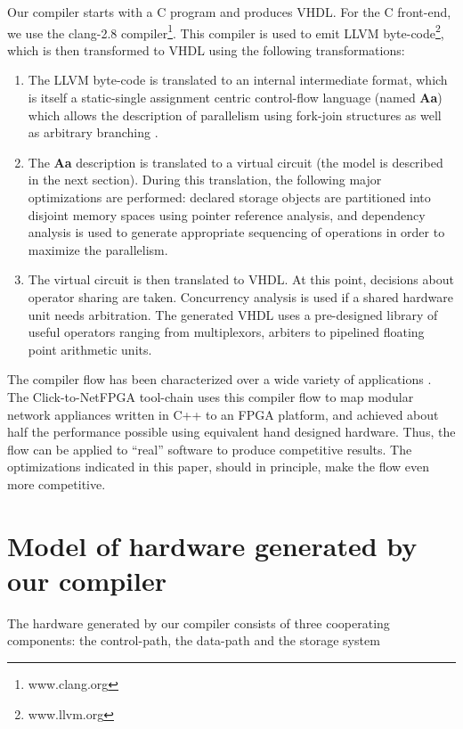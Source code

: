 \documentclass[conference]{IEEEtran}
\begin{document}
Our compiler starts with a C program and produces VHDL.  For the
C front-end, we use the clang-2.8 compiler\footnote{www.clang.org}.
This compiler is used to emit LLVM byte-code\footnote{www.llvm.org}, 
which is then transformed to VHDL using the following transformations:
\begin{enumerate}
\item The LLVM byte-code is translated to an internal intermediate
format, which is itself a static-single assignment centric 
control-flow language (named {\bf Aa}) which allows the description of parallelism
using fork-join structures as well as arbitrary branching \cite{Aa}.
\item The {\bf Aa} description is translated to a virtual circuit (the model
is described in the next section).  During this translation, the
following major optimizations
are performed:  declared storage objects are partitioned into disjoint memory
spaces using pointer reference analysis, and dependency analysis is used to
generate appropriate sequencing of operations in order to maximize the 
parallelism.
\item The virtual circuit is then translated to VHDL.  At this point,
decisions about operator sharing are taken.  Concurrency analysis is
used if a shared hardware unit needs arbitration.  The generated
VHDL uses a pre-designed library of useful operators ranging from
multiplexors, arbiters to pipelined floating point arithmetic units.
\end{enumerate}

The compiler flow has been characterized over a wide variety
of applications \cite{dsd2010}.   The Click-to-NetFPGA tool-chain \cite{usenix2012} 
uses this compiler flow to map modular network appliances written in C++ to
an FPGA platform, and achieved about half the
performance possible using equivalent hand designed hardware.  
Thus,  the flow can be applied to ``real'' software
to produce competitive results.  The optimizations indicated in this
paper, should in principle, make the flow even more competitive.




\section{Model of hardware generated by our compiler}

The hardware generated by our compiler consists of three
cooperating components: the control-path, the data-path and
the storage system \cite{ahir}
\end{document}

